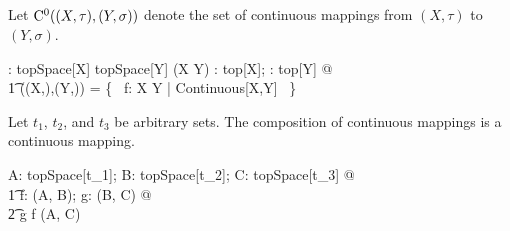 \documentclass[11pt, oneside]{article}
\begin{document}
\subsection{}

Let $\operatorname{C^0}((X,\tau),(Y,\sigma))$ denote the set of continuous mappings from $(X,\tau)$ to $(Y,\sigma)$.

\begin{gendef}[X,Y]
	\CzeroTT: topSpace[X] \cross topSpace[Y] \fun \power (X \fun Y)
\where
	\forall \tau: top[X]; \sigma: top[Y] @ \\
	\t1	\CzeroTT((X,\tau),(Y,\sigma)) = \{~ f: X \fun Y | Continuous[X,Y] ~\}
\end{gendef}

\begin{remark}
Let $t_1$, $t_2$, and $t_3$ be arbitrary sets.
The composition of continuous mappings is a continuous mapping.

\begin{zed}
	\forall A: topSpace[t_1]; B: topSpace[t_2]; C: topSpace[t_3] @ \\
	\t1	\forall f: \CzeroTT(A, B); g: \CzeroTT(B, C) @ \\
	\t2		g \circ f \in \CzeroTT(A, C)
\end{zed}

\end{remark}


\printbibliography
\end{document}
